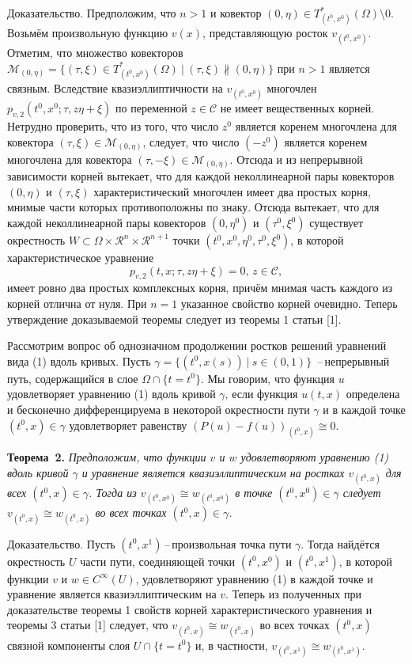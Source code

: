 \documentclass[a5paper, 12pt, openbib]{report}
\begin{document}
Доказательство. Предположим, что $n>1$ и ковектор $(0,\eta)\in T^{\ast}_{(t^0,x^0)}(\Omega)\setminus 0$. Возьмём произвольную функцию $v(x)$,   представляющую росток $v_{(t^0,x^0)}$. Отметим, что
множество ковекторов
${\mathcal M}_{(0,\eta)}=\{(\tau,\xi)\in T^{\ast}_{(t^0,x^0)}(\Omega)~|~
(\tau,\xi) \not\parallel  (0,\eta)\}$ при $n>1$ является связным. Вследствие квазиэллиптичности на  $v_{(t^0,x^0)}$
 многочлен $p_{v,2}(t^0,x^0;\tau,z\eta+\xi)$ по переменной $z\in {\mathcal C}$ не имеет вещественных корней. Нетрудно проверить, что из того, что
число $z^0$ является коренем многочлена для ковектора $(\tau,\xi)\in {\mathcal M}_{(0,\eta)}$, следует, что число $(-z^0)$ является  коренем многочлена для  ковектора $(\tau,-\xi)\in {\mathcal M}_{(0,\eta)}$. Отсюда и из непрерывной зависимости корней вытекает, что для каждой неколлинеарной пары ковекторов
$(0,\eta)$ и $(\tau,\xi)$ характеристический многочлен имеет два простых корня, мнимые части которых противоположны по знаку. Отсюда вытекает, что для каждой неколлинеарной пары ковекторов $(0,\eta^0)$ и $(\tau^0,\xi^0)$ существует окрестность $W\subset \Omega\times{\mathcal R}^n\times{\mathcal R}^{n+1}$ точки $(t^0,x^0,\eta^0,\tau^0,\xi^0)$, в которой характеристическое уравнение
$$
p_{v,2}(t,x;\tau,z\eta+\xi)=0,\,z\in{\mathcal C},
$$
имеет ровно два простых комплексных корня, причём мнимая часть каждого из корней отлична от нуля. При $n=1$ указанное свойство корней очевидно. Теперь утверждение доказываемой теоремы следует из теоремы 1 статьи [1].

Рассмотрим вопрос об однозначном продолжении ростков решений уравнений вида (1) вдоль кривых.
Пусть $\gamma=\{(t^0,x(s))~|~s\in(0,1)\}$ \,--\,непрерывный путь, содержащийся в слое $\Omega\cap\{t=t^0\}$.  Мы говорим, что функция $u$ удовлетворяет уравнению (1) вдоль кривой $\gamma$, если функция $u(t,x)$ определена и бесконечно дифференцируема в некоторой окрестности пути $\gamma$  и в каждой точке $(t^0,x)\in\gamma$ удовлетворяет равенству $(P(u)-f(u))_{(t^0,x)}\cong 0$. 

\textbf{Теорема~2.} {\it 
Предположим, что функции $v$ и $w$ удовлетворяют уравнению {\rm (1)} вдоль кривой $\gamma$ и уравнение
является квазиэллиптическим на ростках  $v_{(t^0,x)}$ для всех $(t^0,x)\in\gamma$. Тогда из $v_{(t^0,x^0)}\cong w_{(t^0,x^0)}$ в точке
$(t^0,x^0)\in\gamma$ следует $v_{(t^0,x)}\cong w_{(t^0,x)}$ во всех точках
$(t^0,x)\in\gamma$.
}

Доказательство. Пусть $(t^0,x^1)$\,--\,произвольная точка пути $\gamma$. Тогда
найдётся окрестность $U$ части пути, соединяющей точки  $(t^0,x^0)$ и  $(t^0,x^1)$, в которой функции $v$ и $w\in C^{\infty}(U)$, удовлетворяют уравнению (1) в каждой точке и уравнение является квазиэллиптическим на $v$.
Теперь  из полученных при доказательстве теоремы 1 свойств корней характеристического уравнения и теоремы 3 статьи [1] следует, что $v_{(t^0,x)}\cong w_{(t^0,x)}$ во всех точках $(t^0,x)$ связной компоненты слоя $U\cap\{t=t^0\}$ и, в частности, $v_{(t^0,x^1)}\cong w_{(t^0,x^1)}$.
\end{document}
